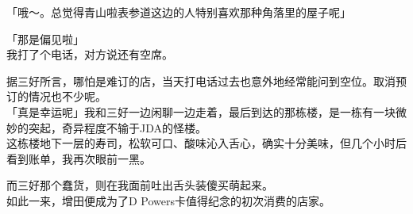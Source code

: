 「哦～。总觉得青山啦表参道这边的人特别喜欢那种角落里的屋子呢」

「那是偏见啦」\\

我打了个电话，对方说还有空席。

据三好所言，哪怕是难订的店，当天打电话过去也意外地经常能问到空位。取消预订的情况也不少呢。\\

「真是幸运呢」我和三好一边闲聊一边走着，最后到达的那栋楼，是一栋有一块微妙的突起，奇异程度不输于JDA的怪楼。\\

这栋楼地下一层的寿司，松软可口、酸味沁入舌心，确实十分美味，但几个小时后看到账单，我再次眼前一黑。

而三好那个蠢货，则在我面前吐出舌头装傻买萌起来。\\

如此一来，增田便成为了D Powers卡值得纪念的初次消费的店家。\\
